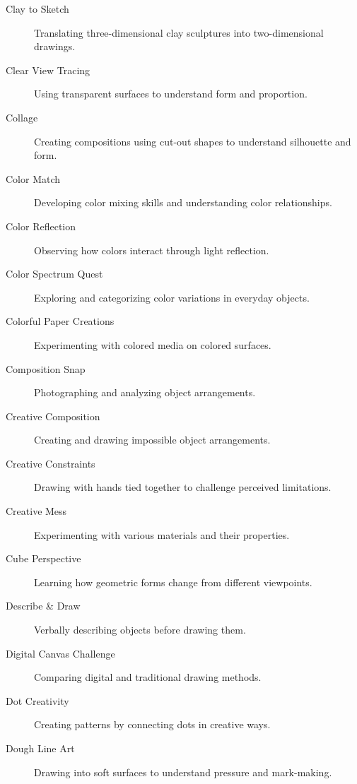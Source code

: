\documentclass{article}
\begin{document}
\begin{description}
    \item[Clay to Sketch] Translating three-dimensional clay sculptures into two-dimensional drawings.

    \item[Clear View Tracing] Using transparent surfaces to understand form and proportion.

    \item[Collage] Creating compositions using cut-out shapes to understand silhouette and form.

    \item[Color Match] Developing color mixing skills and understanding color relationships.

    \item[Color Reflection] Observing how colors interact through light reflection.

    \item[Color Spectrum Quest] Exploring and categorizing color variations in everyday objects.

    \item[Colorful Paper Creations] Experimenting with colored media on colored surfaces.

    \item[Composition Snap] Photographing and analyzing object arrangements.

    \item[Creative Composition] Creating and drawing impossible object arrangements.

    \item[Creative Constraints] Drawing with hands tied together to challenge perceived limitations.

    \item[Creative Mess] Experimenting with various materials and their properties.

    \item[Cube Perspective] Learning how geometric forms change from different viewpoints.

    \item[Describe \& Draw] Verbally describing objects before drawing them.

    \item[Digital Canvas Challenge] Comparing digital and traditional drawing methods.

    \item[Dot Creativity] Creating patterns by connecting dots in creative ways.

    \item[Dough Line Art] Drawing into soft surfaces to understand pressure and mark-making.


\end{description}
\end{document}
